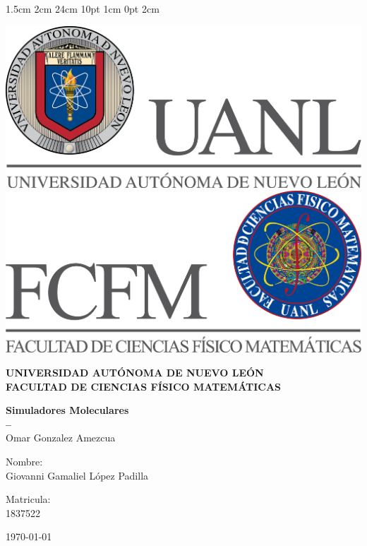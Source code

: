\documentclass[12pt,letterpaper]{article}
\begin{document}
\setmargins{2.5cm}      
{1.5cm}                     
{2cm}  
{24cm}                    
{10pt}                          
{1cm}                          
{0pt}                             
{2cm}
\begin{titlepage}
\begin{center}
\includegraphics[scale=0.40]{../../../Logos/uanl.png} 
\hspace{2.5cm}
\includegraphics[scale=0.40]{../../../Logos/fcfm.png}
\end{center}
\vspace{2cm}
\begin{center}
\textbf{
UNIVERSIDAD AUTÓNOMA DE NUEVO LEÓN\\
FACULTAD DE CIENCIAS
FÍSICO MATEMÁTICAS}\\
\vspace*{2cm}
\begin{large}
\vspace{1cm}
\large{\textbf{Simuladores Moleculares}}\\
\textbf{--}\\
Omar Gonzalez Amezcua\\
\end{large}
\vspace{3.5cm}
\begin{minipage}{0.6\linewidth}
\vspace{0.5cm}
\changefontsizes{14pt}
Nombre:\\
Giovanni Gamaliel López Padilla\\
\end{minipage}
\begin{minipage}{0.2\linewidth}
\changefontsizes{14pt}
Matricula:\\
1837522
\end{minipage}
\end{center}
\vspace{4cm}
\begin{flushright}
\today
\end{flushright}
\end{titlepage}
\end{document}
